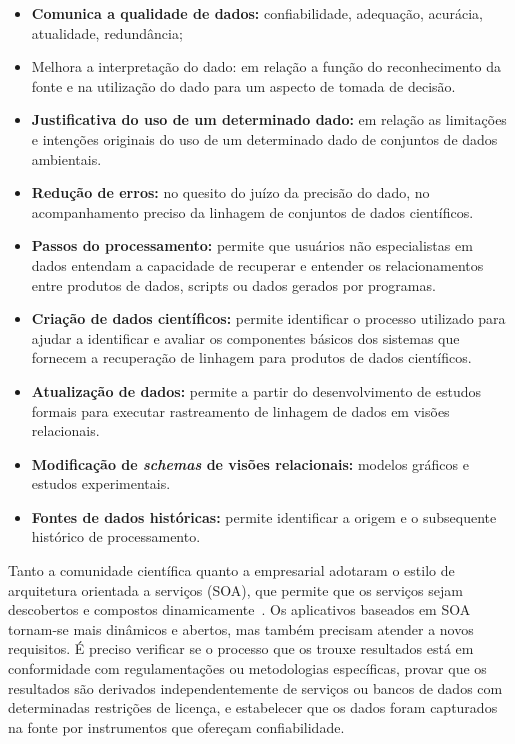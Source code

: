 \documentclass[portugues]{ic-tese}
\begin{document}
\begin{itemize}
\item \textbf{Comunica a qualidade de dados:} confiabilidade, adequação, acurácia, atualidade, redundância;
\item Melhora a interpretação do dado: em relação a função do reconhecimento da fonte e na utilização do dado para um aspecto de tomada de decisão.
\item \textbf{Justificativa do uso de um determinado dado:} em relação as limitações e intenções originais do uso de um determinado dado de conjuntos de dados ambientais.
\item \textbf{Redução de erros:} no quesito do juízo da precisão do dado, no acompanhamento preciso da linhagem de conjuntos de dados científicos.
\item \textbf{Passos do processamento:} permite que usuários não especialistas em dados entendam a capacidade de recuperar e entender os relacionamentos entre produtos de dados, scripts ou dados gerados por programas.
\item \textbf{Criação de dados científicos:} permite identificar o processo utilizado para ajudar a identificar e avaliar os componentes básicos dos sistemas que fornecem a recuperação de linhagem para produtos de dados científicos.
\item \textbf{Atualização de dados:} permite a partir do desenvolvimento de estudos formais para executar rastreamento de linhagem de dados em visões relacionais.
\item \textbf{Modificação de \textit{schemas} de visões relacionais:} modelos gráficos e estudos experimentais.
\item \textbf{Fontes de dados históricas:} permite identificar a origem e o subsequente histórico de processamento.
\end{itemize}

Tanto a comunidade científica quanto a empresarial adotaram o estilo de arquitetura orientada a serviços (SOA), que permite que os serviços sejam descobertos e compostos dinamicamente~\citep{Moreau_2008}. Os aplicativos baseados em SOA tornam-se mais dinâmicos e abertos, mas também precisam atender a novos requisitos. É preciso verificar se o processo que os trouxe resultados está em conformidade com regulamentações ou metodologias específicas, provar que os resultados são derivados independentemente de serviços ou bancos de dados com determinadas restrições de licença, e estabelecer que os dados foram capturados na fonte por instrumentos que ofereçam confiabilidade.
\end{document}
